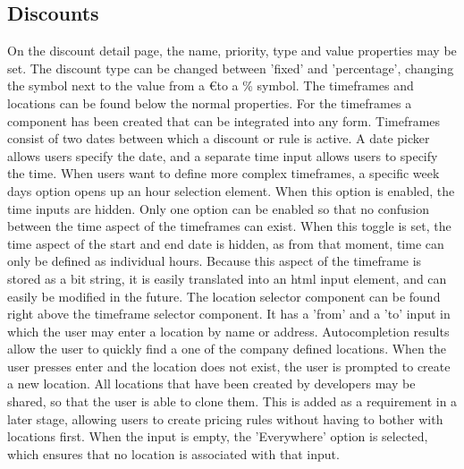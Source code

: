 \subsection{Discounts}
On the discount detail page, the name, priority, type and value properties may be set. The discount type can be changed between 'fixed' and 'percentage', changing the symbol next to the value from a \euro to a \% symbol. The timeframes and locations can be found below the normal properties. For the timeframes a component has been created that can be integrated into any form. Timeframes consist of two dates between which a discount or rule is active. A date picker allows users specify the date, and a separate time input allows users to specify the time. When users want to define more complex timeframes, a specific week days option opens up an hour selection element. When this option is enabled, the time inputs are hidden. Only one option can be enabled so that no confusion between the time aspect of the timeframes can exist. When this toggle is set, the time aspect of the start and end date is hidden, as from that moment, time can only be defined as individual hours. Because this aspect of the timeframe is stored as a bit string, it is easily translated into an html input element, and can easily be modified in the future. The location selector component can be found right above the timeframe selector component. It has a 'from' and a 'to' input in which the user may enter a location by name or address. Autocompletion results allow the user to quickly find a one of the company defined locations. When the user presses enter and the location does not exist, the user is prompted to create a new location. All locations that have been created by developers may be shared, so that the user is able to clone them. This is added as a requirement in a later stage, allowing users to create pricing rules without having to bother with locations first. When the input is empty, the 'Everywhere' option is selected, which ensures that no location is associated with that input.

